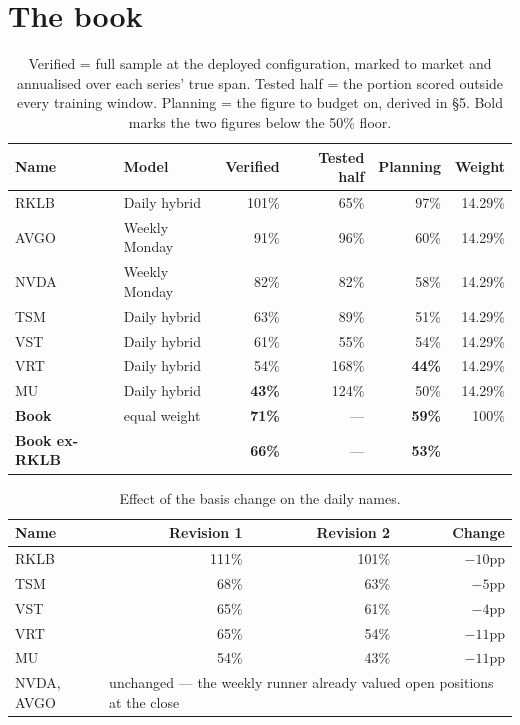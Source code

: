 \documentclass[11pt]{article}
\begin{document}
\section{The book}

\begin{table}[H]\centering\small
\begin{tabular}{llrrrr}
\toprule
\textbf{Name} & \textbf{Model} & \textbf{Verified} & \textbf{Tested half} & \textbf{Planning} &
\textbf{Weight}\\
\midrule
\rowcolor{bckeep} RKLB & Daily hybrid   & 101\% & 65\%  & 97\%  & 14.29\%\\
AVGO & Weekly Monday  & 91\%  & 96\%  & 60\%  & 14.29\%\\
\rowcolor{bckeep} NVDA & Weekly Monday  & 82\%  & 82\%  & 58\%  & 14.29\%\\
TSM  & Daily hybrid   & 63\%  & 89\%  & 51\%  & 14.29\%\\
\rowcolor{bckeep} VST  & Daily hybrid   & 61\%  & 55\%  & 54\%  & 14.29\%\\
VRT  & Daily hybrid   & 54\%  & 168\% & \textbf{44\%} & 14.29\%\\
\rowcolor{bckeep} MU   & Daily hybrid   & \textbf{43\%} & 124\% & 50\%  & 14.29\%\\
\midrule
\textbf{Book} & equal weight & \textbf{71\%} & --- & \textbf{59\%} & 100\%\\
\textbf{Book ex-RKLB} & & \textbf{66\%} & --- & \textbf{53\%} & \\
\bottomrule
\end{tabular}
\caption{Verified = full sample at the deployed configuration, marked to market and annualised
over each series' true span. Tested half = the portion scored outside every training window.
Planning = the figure to budget on, derived in \S5. Bold marks the two figures below the 50\%
floor.}
\end{table}

\begin{table}[H]\centering\small
\begin{tabular}{lrrr}
\toprule
\textbf{Name} & \textbf{Revision 1} & \textbf{Revision 2} & \textbf{Change}\\
\midrule
\rowcolor{bckeep} RKLB & 111\% & 101\% & $-10$pp\\
TSM  & 68\% & 63\% & $-5$pp\\
\rowcolor{bckeep} VST  & 65\% & 61\% & $-4$pp\\
VRT  & 65\% & 54\% & $-11$pp\\
\rowcolor{bckeep} MU   & 54\% & 43\% & $-11$pp\\
\midrule
NVDA, AVGO & \multicolumn{3}{l}{unchanged --- the weekly runner already valued open positions at
the close}\\
\bottomrule
\end{tabular}
\caption{Effect of the basis change on the daily names.}
\end{table}
\end{document}

